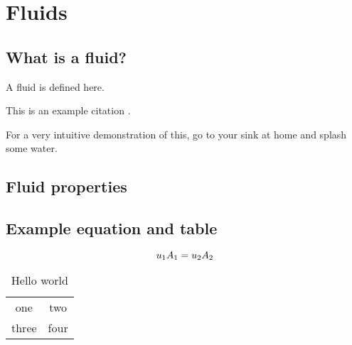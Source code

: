 
\chapter{Fluids}
\label{ch:fluids}

\section{What is a fluid?}

\begin{defn}
A fluid is defined here.
\end{defn}

This is an example citation \cite{Janeway:2392, Evangelista:2010}.

\begin{demo} 
For a very intuitive demonstration of this, go to your sink at home and splash some water.
\end{demo}


\section{Fluid properties}

\section{Example equation and table}

\begin{equation}
u_1 A_1 = u_2 A_2
\label{eq:continuity}
\index{equation!continuity}
\end{equation}

\begin{table}
\caption{Hello world}
\begin{center}
\begin{tabular}{cc}
one & two \\
three & four \\
\end{tabular}
\end{center}
\end{table}


